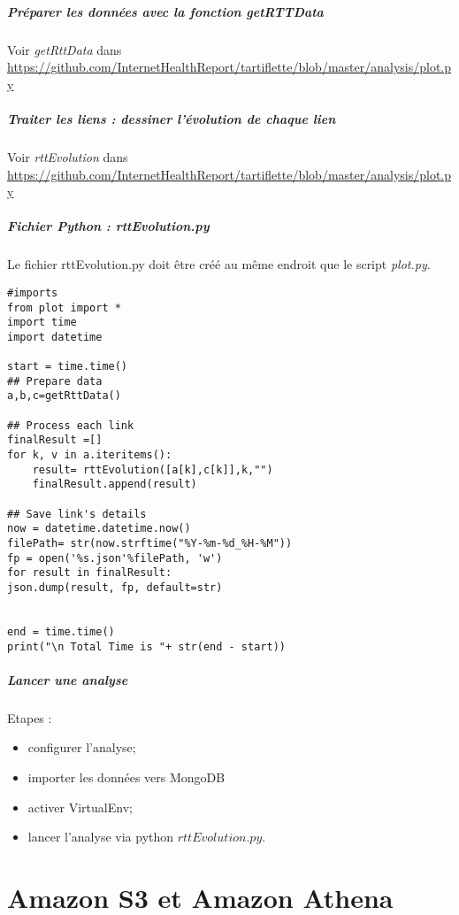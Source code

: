 \documentclass[]{report}
\begin{document}
\paragraph{Préparer les données avec la fonction getRTTData }
Voir  \textit{getRttData} dans  \url{https://github.com/InternetHealthReport/tartiflette/blob/master/analysis/plot.py}
\paragraph{Traiter  les liens : dessiner l'évolution de chaque lien}
Voir  \textit{rttEvolution} dans  \url{https://github.com/InternetHealthReport/tartiflette/blob/master/analysis/plot.py}
\paragraph{Fichier Python : rttEvolution.py}

Le fichier rttEvolution.py doit être créé au même endroit que le script \textit{plot.py}.
\begin{lstlisting}
#imports 
from plot import *
import time
import datetime

start = time.time()
## Prepare data
a,b,c=getRttData()

## Process each link
finalResult =[]
for k, v in a.iteritems():
	result= rttEvolution([a[k],c[k]],k,"")
	finalResult.append(result)

## Save link's details
now = datetime.datetime.now()
filePath= str(now.strftime("%Y-%m-%d_%H-%M"))
fp = open('%s.json'%filePath, 'w') 
for result in finalResult:
json.dump(result, fp, default=str)


end = time.time()
print("\n Total Time is "+ str(end - start))
\end{lstlisting}

\paragraph{Lancer une analyse}

Etapes : 
\begin{itemize}
	\item configurer l'analyse;
	\item importer les données vers MongoDB
	\item activer VirtualEnv;
	\item lancer l'analyse via python $ rttEvolution.py $.  
\end{itemize}

\chapter{Amazon S3 et Amazon Athena}
\end{document}
